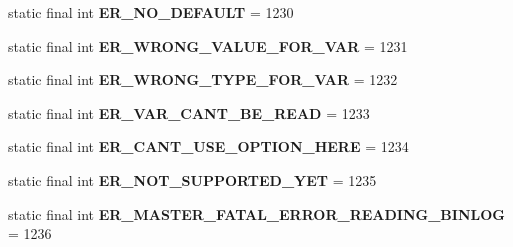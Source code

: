 \begin{DoxyCompactItemize}
\item 
\mbox{\label{classcom_1_1mysql_1_1cj_1_1exceptions_1_1_mysql_error_numbers_a8b966d03fa21b94a2ecc713f62ac78f2}} 
static final int {\bfseries E\+R\+\_\+\+N\+O\+\_\+\+D\+E\+F\+A\+U\+LT} = 1230
\item 
\mbox{\label{classcom_1_1mysql_1_1cj_1_1exceptions_1_1_mysql_error_numbers_a512f1aa28b048e877e8512e18186428d}} 
static final int {\bfseries E\+R\+\_\+\+W\+R\+O\+N\+G\+\_\+\+V\+A\+L\+U\+E\+\_\+\+F\+O\+R\+\_\+\+V\+AR} = 1231
\item 
\mbox{\label{classcom_1_1mysql_1_1cj_1_1exceptions_1_1_mysql_error_numbers_ad8c8ac3538820d2614d5c919259bd8fc}} 
static final int {\bfseries E\+R\+\_\+\+W\+R\+O\+N\+G\+\_\+\+T\+Y\+P\+E\+\_\+\+F\+O\+R\+\_\+\+V\+AR} = 1232
\item 
\mbox{\label{classcom_1_1mysql_1_1cj_1_1exceptions_1_1_mysql_error_numbers_a56ec6afdb198afbc975ddc62f4cc2f6d}} 
static final int {\bfseries E\+R\+\_\+\+V\+A\+R\+\_\+\+C\+A\+N\+T\+\_\+\+B\+E\+\_\+\+R\+E\+AD} = 1233
\item 
\mbox{\label{classcom_1_1mysql_1_1cj_1_1exceptions_1_1_mysql_error_numbers_a4ca1bbc229f93efbd11e1ab5ffe768ec}} 
static final int {\bfseries E\+R\+\_\+\+C\+A\+N\+T\+\_\+\+U\+S\+E\+\_\+\+O\+P\+T\+I\+O\+N\+\_\+\+H\+E\+RE} = 1234
\item 
\mbox{\label{classcom_1_1mysql_1_1cj_1_1exceptions_1_1_mysql_error_numbers_aa6de718089497f274d614e8b4f16f7ef}} 
static final int {\bfseries E\+R\+\_\+\+N\+O\+T\+\_\+\+S\+U\+P\+P\+O\+R\+T\+E\+D\+\_\+\+Y\+ET} = 1235
\item 
\mbox{\label{classcom_1_1mysql_1_1cj_1_1exceptions_1_1_mysql_error_numbers_adff186f6e06480c04bfe345bf8b30897}} 
static final int {\bfseries E\+R\+\_\+\+M\+A\+S\+T\+E\+R\+\_\+\+F\+A\+T\+A\+L\+\_\+\+E\+R\+R\+O\+R\+\_\+\+R\+E\+A\+D\+I\+N\+G\+\_\+\+B\+I\+N\+L\+OG} = 1236

\end{DoxyCompactItemize}
